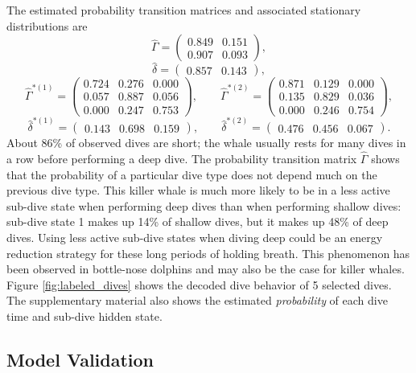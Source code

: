 The estimated probability transition matrices and associated stationary distributions are
%
$$\hat \Gamma = \begin{pmatrix} 
0.849  &  0.151 \\
0.907  &  0.093
\end{pmatrix},$$
$$\hat \delta = \begin{pmatrix} 0.857 & 0.143 \end{pmatrix},$$
%
$$\hat \Gamma^{*(1)} = \begin{pmatrix} 
0.724 & 0.276 & 0.000 \\
0.057 & 0.887 & 0.056 \\
0.000 & 0.247 & 0.753
\end{pmatrix}, \qquad 
\hat \Gamma^{*(2)} = \begin{pmatrix} 
0.871 & 0.129 & 0.000 \\
0.135 & 0.829 & 0.036 \\
0.000 & 0.246 & 0.754
\end{pmatrix},$$
$$\hat \delta^{*(1)} = \begin{pmatrix} 0.143 & 0.698 & 0.159 \end{pmatrix}, \qquad
\hat \delta^{*(2)} = \begin{pmatrix} 0.476 & 0.456 & 0.067 \end{pmatrix}.$$
%
About 86\% of observed dives are short; the whale usually rests for many dives in a row before performing a deep dive. The probability transition matrix $\hat \Gamma$ shows that the probability of a particular dive type does not depend much on the previous dive type. This killer whale is much more likely to be in a less active sub-dive state when performing deep dives than when performing shallow dives:  sub-dive state 1 makes up 14\% of shallow dives, but it makes up 48\% of deep dives. Using less active sub-dive states when diving deep could be an energy reduction strategy for these long periods of holding breath. This phenomenon has been observed in bottle-nose dolphins \citep{Williams:1999} and may also be the case for killer whales. Figure \ref{fig:labeled_dives} shows the decoded dive behavior of 5 selected dives. The supplementary material also shows the estimated \textit{probability} of each dive time and sub-dive hidden state.

\subsection{Model Validation}
\label{subsec:model_validation}

